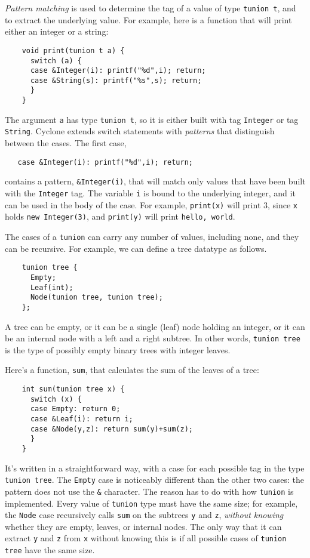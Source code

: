 \emph{Pattern matching} is used to determine the tag of a value of
type \texttt{tunion t}, and to extract the underlying value.  For
example, here is a function that will print either an integer or a
string:
\begin{verbatim}
    void print(tunion t a) {
      switch (a) {
      case &Integer(i): printf("%d",i); return;
      case &String(s): printf("%s",s); return;
      }
    }
\end{verbatim}
The argument \texttt{a} has type \texttt{tunion t}, so it is either
built with tag \texttt{Integer} or tag \texttt{String}.  Cyclone
extends switch statements with \emph{patterns} that
distinguish between the cases.  The first case,
\begin{verbatim}
   case &Integer(i): printf("%d",i); return;
\end{verbatim}
contains a pattern, \texttt{\&Integer(i)}, that will match only values
that have been built with the \texttt{Integer} tag.  The variable
\texttt{i} is bound to the underlying integer, and it can be used in
the body of the case.  For example, \texttt{print(x)} will print 3,
since \texttt{x} holds \texttt{new Integer(3)}, and
\texttt{print(y)} will print \texttt{hello, world}.

The cases of a \texttt{tunion} can carry any number of values,
including none, and they can be recursive.  For example, we can define
a tree datatype as follows.
\begin{verbatim}
    tunion tree {
      Empty;
      Leaf(int);
      Node(tunion tree, tunion tree);
    };
\end{verbatim}
A tree can be empty, or it can be a single (leaf) node holding an
integer, or it can be an internal node with a left and a right
subtree.  In other words, \texttt{tunion tree} is the type of possibly
empty binary trees with integer leaves.

Here's a function, \texttt{sum}, that calculates the sum of the leaves
of a tree:
\begin{verbatim}
    int sum(tunion tree x) {
      switch (x) {
      case Empty: return 0;
      case &Leaf(i): return i;
      case &Node(y,z): return sum(y)+sum(z);
      }
    }
\end{verbatim}

It's written in a straightforward way, with a case for each possible
tag in the type \texttt{tunion tree}.  The \texttt{Empty} case is
noticeably different than the other two cases: the pattern does not
use the \texttt{\&} character.  The reason has to do with how
\texttt{tunion} is implemented.  Every value of \texttt{tunion} type
must have the same size; for example, the \texttt{Node} case
recursively calls \texttt{sum} on the subtrees \texttt{y} and
\texttt{z}, \emph{without knowing} whether they are empty, leaves, or
internal nodes.  The only way that it can extract \texttt{y} and
\texttt{z} from \texttt{x} without knowing this is if all possible
cases of \texttt{tunion tree} have the same size.


